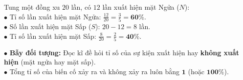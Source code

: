 \documentclass[14pt,a4paper,oneside]{extbook}
\begin{document}
\noindent
\begin{minipage}[t]{0.54\textwidth}
  \begin{tcolorbox}[
    enhanced,
    title={\footnotesize\bfseries\color{white}\faLightbulbO\ Ví dụ thí nghiệm tung đồng xu},
    colback=green!3!white,
    colframe=green!60!black,
    arc=2.5mm, boxrule=0.8pt, top=1.8mm, bottom=1.8mm, left=2.2mm, right=2.2mm
  ]
    \footnotesize
    Tung một đồng xu $20$ lần, có $12$ lần xuất hiện mặt Ngửa ($N$):\\
    $\bullet$ Tỉ số lần xuất hiện mặt Ngửa: $\frac{12}{20} = \frac{3}{5} = \mathbf{60\%}$.\\
    $\bullet$ Số lần xuất hiện mặt Sấp ($S$): $20 - 12 = 8$ lần.\\
    $\bullet$ Tỉ số lần xuất hiện mặt Sấp: $\frac{8}{20} = \frac{2}{5} = \mathbf{40\%}$.
  \end{tcolorbox}
\end{minipage}%
\hfill
\begin{minipage}[t]{0.44\textwidth}
  \begin{tcolorbox}[
    enhanced,
    title={\footnotesize\bfseries\color{white}\faExclamationTriangle\ Mẹo tránh bẫy trắc nghiệm},
    colback=red!2!white,
    colframe=red!70!black,
    arc=2.5mm, boxrule=0.8pt, top=1.8mm, bottom=1.8mm, left=2.2mm, right=2.2mm
  ]
    \footnotesize
    $\bullet$ \textbf{Bẫy đối tượng:} Đọc kĩ đề hỏi tỉ số của sự kiện xuất hiện hay \textbf{không xuất hiện} (mặt ngửa hay mặt sấp).\\
    $\bullet$ Tổng tỉ số của biến cố xảy ra và không xảy ra luôn bằng $\mathbf{1}$ (hoặc $\mathbf{100\%}$).
  \end{tcolorbox}
\end{minipage}
\end{document}
